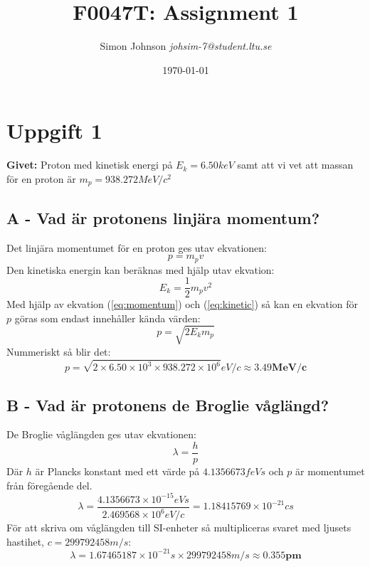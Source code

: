 \documentclass{article}
\begin{document}
\title{F0047T: Assignment 1}
\author{Simon Johnson \textit{johsim-7@student.ltu.se}}
\date{\today}
\maketitle

  \section*{Uppgift 1}
    \textbf{Givet:} Proton med kinetisk energi på $E_k=6.50keV$ samt att vi vet att massan för en proton är $m_p=938.272MeV/c^2$

    \subsection*{A - Vad är protonens linjära momentum?}
      Det linjära momentumet för en proton ges utav ekvationen:
      \begin{equation}
        p=m_pv
        \label{eq:momentum}
      \end{equation}
      Den kinetiska energin kan beräknas med hjälp utav ekvation:
      \begin{equation}
        E_k=\frac{1}{2}m_pv^2
        \label{eq:kinetic}
      \end{equation}
      Med hjälp av ekvation (\ref{eq:momentum}) och (\ref{eq:kinetic}) så kan en ekvation för $p$ göras som endast innehåller kända värden:
      \begin{equation}
        p=\sqrt{2E_km_p}
      \end{equation}
      Nummeriskt så blir det:
      \begin{equation}
        p=\sqrt{2\times6.50\times10^3\times938.272\times10^6}eV/c\approx\mathbf{3.49MeV/c}
      \end{equation}

    \subsection*{B - Vad är protonens de Broglie våglängd?}
      De Broglie våglängden ges utav ekvationen:
      \begin{equation}
        \lambda=\frac{h}{p}
      \end{equation}
      Där $h$ är Plancks konstant med ett värde på $4.1356673feVs$ och $p$ är momentumet från föregående del.
      \begin{equation}
        \lambda=\frac{4.1356673\times10^{-15}eVs}{2.469568\times10^{6}eV/c}=1.18415769\times10^{-21}cs
      \end{equation}
      För att skriva om våglängden till SI-enheter så multipliceras svaret med ljusets hastihet, $c=299792458m/s$:
      \begin{equation}
        \lambda=1.67465187\times10^{-21}s\times299792458m/s\approx\mathbf{0.355pm}
      \end{equation}
\end{document}
